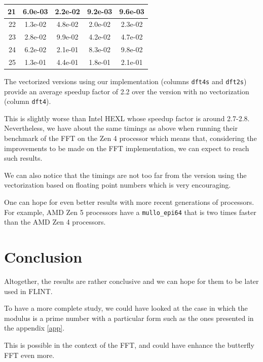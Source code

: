 \documentclass[a4paper]{article}
\begin{document}
\begin{center}
\begin{longtable}{|r|*{4}{c|}}
        \hline
        \cellcolor{myGray} 21 & 6.0e-03 & 2.2e-02 & 9.2e-03 & 9.6e-03 \\
        \hline
        \cellcolor{myGray} 22 & 1.3e-02 & 4.8e-02 & 2.0e-02 & 2.3e-02 \\
        \hline
        \cellcolor{myGray} 23 & 2.8e-02 & 9.9e-02 & 4.2e-02 & 4.7e-02 \\
        \hline
        \cellcolor{myGray} 24 & 6.2e-02 & 2.1e-01 & 8.3e-02 & 9.8e-02 \\
        \hline
        \cellcolor{myGray} 25 & 1.3e-01 & 4.4e-01 & 1.8e-01 & 2.1e-01 \\
        \hline
    \end{longtable}
\end{center}

The vectorized versions using our implementation (columns \texttt{dft4s} and \texttt{dft2s}) provide
an average speedup factor of 2.2 over the version with no vectorization (column \texttt{dft4}).

This is slightly worse than Intel HEXL whose speedup factor is around 2.7-2.8.
Nevertheless, we have about the same timings as above when running their benchmark of the FFT on the
Zen 4 processor which means that, considering the improvements to be made on the FFT implementation,
we can expect to reach such results.

\bigskip
We can also notice that the timings are not too far from the version using the vectorization
based on floating point numbers which is very encouraging.

One can hope for even better results with more recent generations of processors. For example, AMD Zen 5 processors
have a \texttt{mullo\_epi64} that is two times faster than the AMD Zen 4 processors.

\section{Conclusion}

Altogether, the results are rather conclusive and we can hope for them to be later used in FLINT. 

\bigskip
To have a more complete study, we could have looked at the case in which the modulus is a prime number
with a particular form such as the ones presented in the appendix \ref{app}. 

This is possible in the context of the FFT, and could have enhance the butterfly FFT even more.
\end{document}
